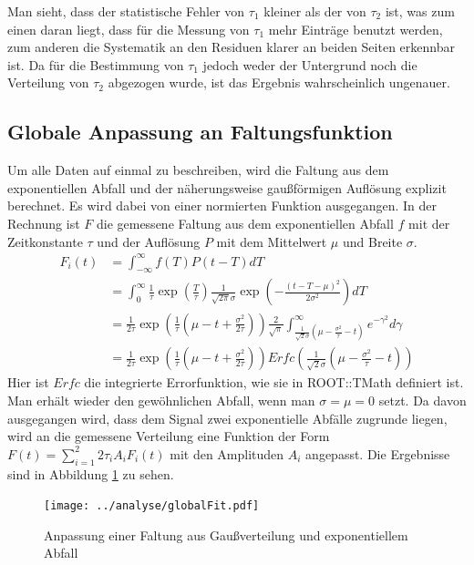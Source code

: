 \documentclass[a4paper,12pt]{article}
\begin{document}
Man sieht, dass der statistische Fehler von $τ_1$ kleiner als der von $τ_2$ ist, was zum einen daran
liegt, dass für die Messung von $τ_1$ mehr Einträge benutzt werden, zum anderen die Systematik an
den Residuen klarer an beiden Seiten erkennbar ist. Da für die Bestimmung von $τ_1$ jedoch weder der
Untergrund noch die Verteilung von $τ_2$ abgezogen wurde, ist das Ergebnis wahrscheinlich ungenauer.

\FloatBarrier
\subsection{Globale Anpassung an Faltungsfunktion}
Um alle Daten auf einmal zu beschreiben, wird die Faltung aus dem exponentiellen Abfall und der
näherungsweise gaußförmigen Auflösung explizit berechnet.
Es wird dabei von einer normierten Funktion ausgegangen.
In der Rechnung ist $F$ die gemessene Faltung aus dem exponentiellen Abfall $f$ mit der
Zeitkonstante $τ$ und der Auflösung $P$ mit dem Mittelwert $μ$ und Breite $σ$.
\begin{align*}
	F_i(t) &= \int_{-\infty}^\infty f(T)P(t-T)dT\\
	&= \int_0^\infty \frac{1}{τ}\exp\left( \frac{T}{τ} \right)\frac{1}{\sqrt{2π}σ}\exp\left( -\frac{(t-T-μ)^2}{2σ^2} \right)dT\\
	&= \frac{1}{2τ} \exp\left( \frac{1}{τ}\left( μ-t+\frac{σ^2}{2τ} \right) \right) \frac{2}{\sqrt{π}}\int_{\frac{1}{\sqrt{2}σ}\left( μ-\frac{σ^2}{τ} -t \right)}^\infty  e^{-γ^2}dγ\\
	&= \frac{1}{2τ} \exp\left( \frac{1}{τ}\left( μ-t+\frac{σ^2}{2τ} \right) \right) Erfc\left(\frac{1}{\sqrt{2}σ}\left( μ-\frac{σ^2}{τ} -t \right)\right)
\end{align*}
Hier ist $Erfc$ die integrierte Errorfunktion, wie sie in ROOT::TMath definiert ist. Man erhält
wieder den gewöhnlichen Abfall, wenn man $σ=μ=0$ setzt.
Da davon ausgegangen wird, dass dem Signal zwei exponentielle Abfälle zugrunde liegen, wird an die
gemessene Verteilung eine Funktion der Form $F(t) = \sum_{i=1}^2 2τ_iA_i F_i(t)$ mit den Amplituden
$A_i$ angepasst. Die Ergebnisse sind in Abbildung \ref{fig:globalFit} zu sehen.

\begin{figure}[htb]
	\centering
	\texttt{[image: ../analyse/globalFit.pdf]}
	\caption{Anpassung einer Faltung aus Gaußverteilung und exponentiellem Abfall}
	\label{fig:globalFit}
\end{figure}
\end{document}
